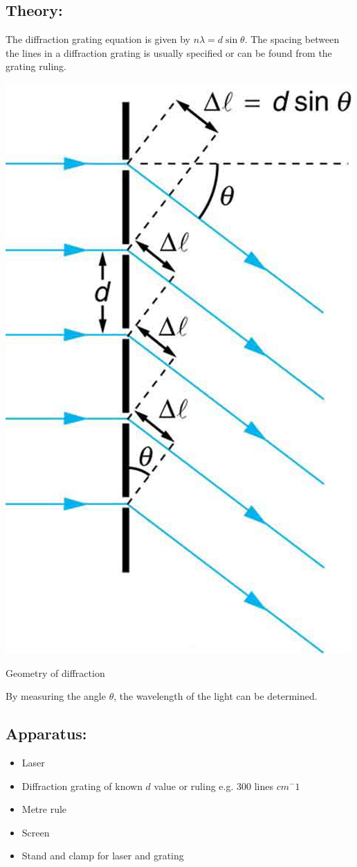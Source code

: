 \subsection{Theory:} 
The diffraction grating equation is given by $n \lambda  =d\sin \theta$. The spacing between the lines in a diffraction grating is usually specified or can be found from the grating ruling.
\begin{marginfigure}
\includegraphics[]{diffraction.jpg}
\caption{Geometry of diffraction}
\end{marginfigure} 
By measuring the angle $\theta$, the wavelength of the light can be determined. 
\subsection{Apparatus:}
\begin{itemize}
\item Laser 
\item Diffraction grating of known $d$ value or ruling e.g. 300 lines $cm^-1$ 
\item Metre rule 
\item Screen 
\item Stand and clamp for laser and grating 
\end{itemize}

